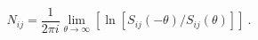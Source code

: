\begin{equation}
N_{ij}=\frac{1}{2\pi i}\lim_{\theta \rightarrow \infty }[\ln [S_{ij}(-\theta
)/S_{ij}(\theta )]]~.
\end{equation}%
